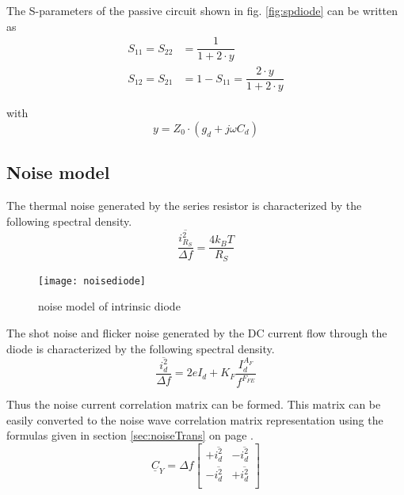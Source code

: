 \documentclass[10pt]{report}
\begin{document}
The S-parameters of the passive circuit shown in
fig. \ref{fig:spdiode} can be written as
\begin{align}
S_{11} = S_{22} &= \dfrac{1}{1 + 2\cdot y}\\
S_{12} = S_{21} &= 1 - S_{11} = \dfrac{2\cdot y}{1 + 2\cdot y}
\end{align}

with
\begin{equation}
y = Z_{0}\cdot \left(g_{d} + j\omega C_{d}\right)
\end{equation}

\subsection{Noise model}

The thermal noise generated by the series resistor is characterized by
the following spectral density.
\begin{equation}
\dfrac{\overline{i_{R_S}^2}}{\Delta f} = \dfrac{4 k_B T}{R_S}
\end{equation}

\begin{figure}[ht]
\begin{center}
\texttt{[image: noisediode]}
\end{center}
\caption{noise model of intrinsic diode}
\label{fig:noisediode}
\end{figure}
\FloatBarrier

The shot noise and flicker noise generated by the DC current flow
through the diode is characterized by the following spectral density.
\begin{equation}
\dfrac{\overline{i_{d}^2}}{\Delta f} = 2e I_d + K_F \dfrac{I_d^{A_F}}{f^{F_{FE}}}
\end{equation}

Thus the noise current correlation matrix can be formed.  This matrix
can be easily converted to the noise wave correlation matrix
representation using the formulas given in section
\ref{sec:noiseTrans} on page \pageref{sec:noiseTrans}.
\begin{equation}
\underline{C}_Y = \Delta f
\begin{bmatrix}
+\overline{i_{d}^2} & -\overline{i_{d}^2}\\
-\overline{i_{d}^2} & +\overline{i_{d}^2}\\
\end{bmatrix}
\end{equation}
\end{document}
